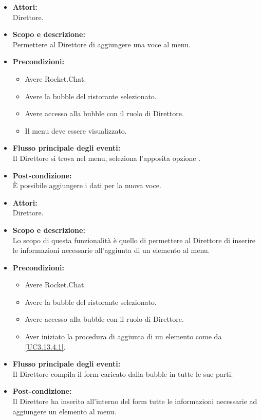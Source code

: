 \begin{itemize}
	\item \textbf{Attori:}
	\\Direttore.
	\item \textbf{Scopo e descrizione:} 
	\\Permettere al Direttore di aggiungere una voce al menu.
	\item \textbf{Precondizioni:}
	\begin{itemize}
		\item Avere Rocket.Chat.
		\item Avere la bubble del ristorante selezionato.
		\item Avere accesso alla bubble con il ruolo di Direttore.
		\item Il menu deve essere visualizzato.
	\end{itemize}
	\item \textbf{Flusso principale degli eventi:}
	\\Il Direttore si trova nel menu, seleziona l'apposita opzione .
	\item \textbf{Post-condizione:}
	\\È possibile aggiungere i dati per la nuova voce.
\end{itemize}


\begin{itemize}
	\item \textbf{Attori:}
	\\Direttore.
	\item \textbf{Scopo e descrizione:} 
	\\Lo scopo di questa funzionalità è quello di permettere al Direttore di inserire le informazioni necessarie all'aggiunta di un elemento al menu.
	\item \textbf{Precondizioni:}
	\begin{itemize}
		\item Avere Rocket.Chat.
		\item Avere la bubble del ristorante selezionato.
		\item Avere accesso alla bubble con il ruolo di Direttore.
		\item Aver iniziato la procedura di aggiunta di un elemento come da \ref{UC3.13.4.1}.
	\end{itemize}
	\item \textbf{Flusso principale degli eventi:}
	\\Il Direttore compila il form caricato dalla bubble in tutte le sue parti.
	\item \textbf{Post-condizione:}
	\\Il Direttore ha inserito all'interno del form tutte le informazioni necessarie ad aggiungere un elemento al menu.
\end{itemize}


